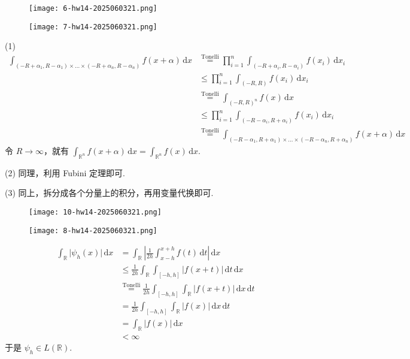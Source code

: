 \begin{exercise}
\begin{figure}[H]
\centering
\texttt{[image: 6-hw14-2025060321.png]}
\label{}
\end{figure}
\begin{figure}[H]
\centering
\texttt{[image: 7-hw14-2025060321.png]}
\label{}
\end{figure}
\end{exercise}
(1)
\[
\begin{aligned}
\int_{(-R+\alpha _1,R-\alpha_1)\times\dots \times(-R+\alpha _n,R-\alpha _n)}^{} f(x+\alpha) \, \mathrm{d}x  & \overset{ \text{Tonelli} }{ = }\prod_{i=1}^{n} \int_{(-R+\alpha _i,R-\alpha _i)}^{} f(x_i) \, \mathrm{d}x_i   \\
 & \leq \prod_{i=1}^{n} \int_{(-R,R)}^{} f(x_i) \, \mathrm{d}x_i \\ 
 & \overset{ \text{Tonelli} }{ = } \int_{(-R,R)^{n}}^{}f(x)  \, \mathrm{d}x   \\
 & \leq \prod_{i=1}^{n} \int_{(-R-\alpha _i,R+\alpha _i)}^{} f(x_i) \, \mathrm{d}x_i \\
 & \overset{ \text{Tonelli} }{ = } \int_{(-R-\alpha _1,R+\alpha_1)\times\dots \times(-R-\alpha _n,R+\alpha _n)}^{} f(x+\alpha) \, \mathrm{d}x
\end{aligned}
\]
令 $R\to \infty$，就有 $\int_{\mathbb{R}^{n}}^{} f(x+\alpha) \, \mathrm{d}x=\int_{\mathbb{R}^{n}}^{} f(x) \, \mathrm{d}x$.

(2)
同理，利用 Fubini 定理即可.

(3)
同上，拆分成各个分量上的积分，再用变量代换即可.

\begin{exercise}
\begin{figure}[H]
\centering
\texttt{[image: 10-hw14-2025060321.png]}
\label{}
\end{figure}
\begin{figure}[H]
\centering
\texttt{[image: 8-hw14-2025060321.png]}
\label{}
\end{figure}
\end{exercise}
\[
\begin{aligned}
\int_{\mathbb{R}}^{} \lvert \psi_{h}(x) \rvert  \, \mathrm{d}x  & =\int_{\mathbb{R}}^{} \left\lvert  \frac{1}{2h}\int_{x-h}^{x+h} f(t) \, \mathrm{d}t   \right\rvert  \, \mathrm{d}x  \\
 & \leq \frac{1}{2h}\int_{\mathbb{R}}^{} \int_{[-h,h]}^{} \lvert f(x+t) \rvert  \, \mathrm{d}t  \, \mathrm{d}x  \\
 & \overset{ \text{Tonelli} }{ = }\frac{1}{2h}\int_{[-h,h]}^{} \int_{\mathbb{R}}^{} \lvert f(x+t) \rvert  \, \mathrm{d}x  \, \mathrm{d}t \\
  & =\frac{1}{2h}\int_{[-h,h]}^{} \int_{\mathbb{R}}^{} \lvert f(x) \rvert  \, \mathrm{d}x  \, \mathrm{d}t \\
  & =\int_{\mathbb{R}}^{} \lvert f(x) \rvert  \, \mathrm{d}x  \\
 & <\infty
\end{aligned}
\]
于是 $\psi_{h}\in L(\mathbb{R})$.

